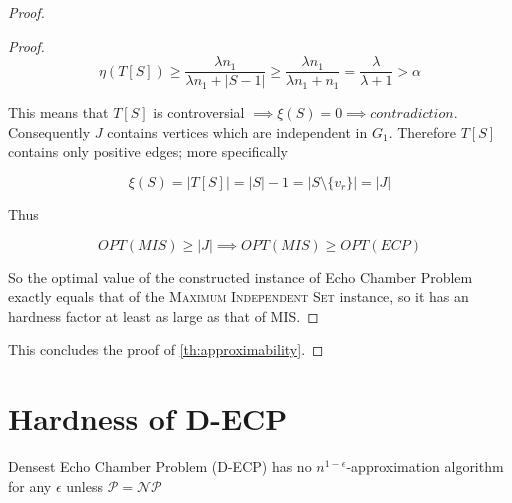 \begin{proof}
\begin{proof}
		\begin{equation}
			\eta(T[S]) \geq \frac{\lambda n_1}{\lambda n_1 + |S-1|} \geq \frac{\lambda n_1}{\lambda n_1 + n_1} = \frac{\lambda
			}{\lambda + 1} > \alpha
		\end{equation}

		This means that $T[S]$ is controversial $\implies \xi(S) = 0
			\implies contradiction$. Consequently $J$
		contains vertices which are independent in $G_1$. Therefore $T[S]$ contains
		only positive edges; more specifically

		\begin{equation}
			\xi(S) = |T[S]| = |S| - 1 = |S \setminus \{v_r\}| = |J|
		\end{equation}

		Thus

		\begin{equation}
			OPT(MIS) \geq |J| \implies OPT(MIS) \geq OPT(ECP)
		\end{equation}

		So the optimal value of the constructed instance of Echo Chamber Problem
		exactly equals that of the \textsc{Maximum Independent Set} instance, so it
		has an hardness factor at least as large as that of MIS.
	\end{proof}

	This concludes the proof of \autoref{th:approximability}.
\end{proof}

\section{Hardness of \acrshort{D-ECP}}%
\label{sub:d-ecp-hardness}

\begin{theorem}
	\label{th:approximability-densest}
	Densest Echo Chamber Problem (D-ECP) has no $n^{1-\epsilon} $-approximation algorithm for
	any $\epsilon$ unless $\mathcal{P} = \mathcal{NP}  $
\end{theorem}

